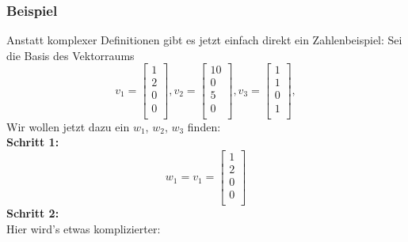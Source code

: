 \documentclass{report}
\begin{document}
		\subsubsection{Beispiel}
			Anstatt komplexer Definitionen gibt es jetzt einfach direkt ein Zahlenbeispiel: Sei die Basis des Vektorraums\\
			\begin{equation*}
				v_1 = \begin{bmatrix} 1 \\ 2 \\ 0 \\ 0 \\ \end{bmatrix}, 
				v_2 = \begin{bmatrix} 10 \\ 0 \\ 5 \\ 0 \\ \end{bmatrix}, 
				v_3 = \begin{bmatrix} 1 \\ 1 \\ 0 \\ 1 \\ \end{bmatrix}, 
			\end{equation*}
			Wir wollen jetzt dazu ein $w_1$, $w_2$, $w_3$ finden: \\
			\textbf{Schritt 1:}
			\begin{equation*} w_1 = v_1 = \begin{bmatrix} 1 \\ 2 \\ 0 \\ 0 \\ \end{bmatrix} \end{equation*}
			\textbf{Schritt 2:}\\
			Hier wird's etwas komplizierter:
\end{document}
